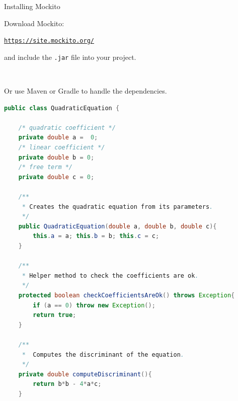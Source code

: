\documentclass[11pt, xcolor=svgnames]{beamer}
\begin{document}


\begin{frame}{Installing Mockito}

Download Mockito:

\texttt{\url{https://site.mockito.org/}}

and include the \texttt{.jar} file into your project.

~

Or use Maven or Gradle to handle the dependencies.

\end{frame}







\begin{frame}[fragile]

\begin{lstlisting}[language=Java,basicstyle=\tiny]
public class QuadraticEquation {

    /* quadratic coefficient */
    private double a =  0;
    /* linear coefficient */
    private double b = 0;
    /* free term */
    private double c = 0;

    /**
     * Creates the quadratic equation from its parameters.
     */
    public QuadraticEquation(double a, double b, double c){
        this.a = a; this.b = b; this.c = c;
    }

    /**
     * Helper method to check the coefficients are ok.
     */
    protected boolean checkCoefficientsAreOk() throws Exception{
        if (a == 0) throw new Exception();
        return true;
    }

    /**
     *  Computes the discriminant of the equation.
     */
    private double computeDiscriminant(){
        return b*b - 4*a*c;
    }

\end{lstlisting}
\end{frame}
\end{document}
